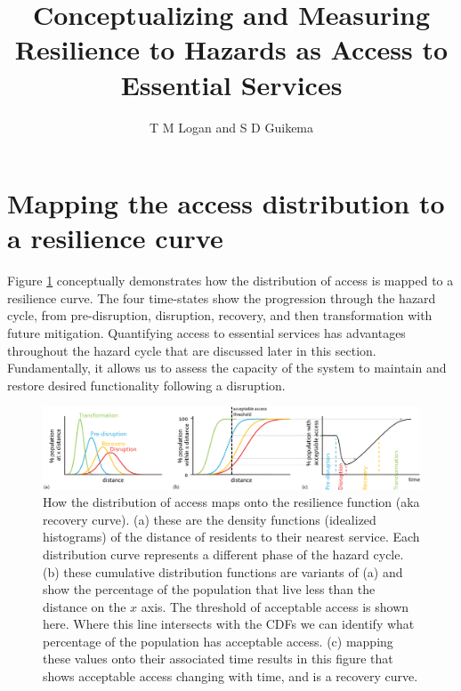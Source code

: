 \documentclass[9pt,twoside,lineno]{pnas-new}
\title{Conceptualizing and Measuring Resilience to Hazards as Access to Essential Services}
\author{T M Logan and S D Guikema}
\begin{document}

\maketitle

\SItext

\section*{Mapping the access distribution to a resilience curve}

Figure \ref{figS:cdf_to_res} conceptually demonstrates how the distribution of access is mapped to a resilience curve. The four time-states show the progression through the hazard cycle, from pre-disruption, disruption, recovery, and then transformation with future mitigation. Quantifying access to essential services has advantages throughout the hazard cycle that are discussed later in this section. Fundamentally, it allows us to assess the capacity of the system to maintain and restore desired functionality following a disruption.

\begin{figure}[h]
    \centering
    \includegraphics[width=\linewidth]{report/fig/dist_to_resil.png}
    \caption{
    How the distribution of access maps onto the resilience function (aka recovery curve). (a) these are the density functions (idealized histograms) of the distance of residents to their nearest service.
    Each distribution curve represents a different phase of the hazard cycle. 
    (b) these cumulative distribution functions are variants of (a) and show the percentage of the population that live less than the distance on the $x$ axis.
    The threshold of acceptable access is shown here. Where this line intersects with the CDFs we can identify what percentage of the population has acceptable access.
    (c) mapping these values onto their associated time results in this figure that shows acceptable access changing with time, and is a recovery curve.
    }
    \label{figS:cdf_to_res}
\end{figure}
\end{document}
